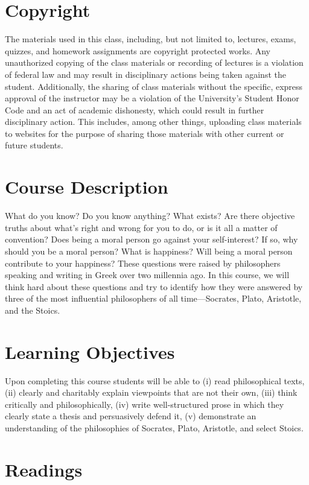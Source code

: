 \documentclass[article,oneside]{memoir}
\begin{document}
\section{Copyright}
The materials used in this class, including, but not limited to, lectures, exams, quizzes, and homework assignments are copyright protected works.  Any unauthorized copying of the class materials or recording of lectures is a violation of federal law and may result in disciplinary actions being taken against the student.  Additionally, the sharing of class materials without the specific, express approval of the instructor may be a violation of the University's Student Honor Code and an act of academic dishonesty, which could result in further disciplinary action.  This includes, among other things, uploading class materials to websites for the purpose of sharing those materials with other current or future students. 

\section{Course Description}

What do you know? Do you know anything? What exists? Are there objective truths about what’s right and wrong for you to do, or is it all a matter of convention? Does being a moral person go against your self-interest? If so, why should you be a moral person? What is happiness? Will being a moral person contribute to your happiness? These questions were raised by philosophers speaking and writing in Greek over two millennia ago. In this course, we will think hard about these questions and try to identify how they were answered by three of the most influential philosophers of all time---Socrates, Plato, Aristotle, and the Stoics. 

\section{Learning Objectives}

Upon completing this course students will be able to (i) read philosophical texts, (ii) clearly and charitably explain viewpoints that
are not their own, (iii) think critically and philosophically, (iv) write well-structured prose in which they clearly state a thesis and persuasively defend it, (v) demonstrate an understanding of the philosophies of Socrates, Plato, Aristotle, and select Stoics.


\section{Readings}
\end{document}
